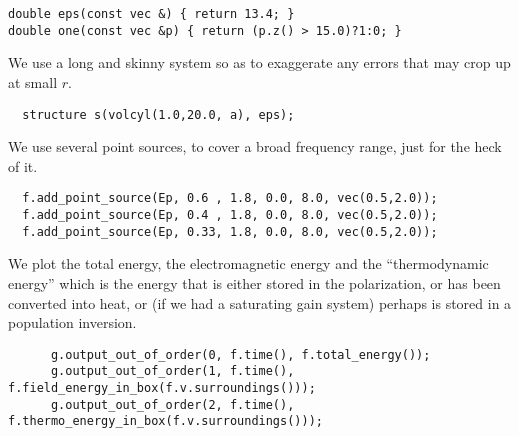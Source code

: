 \begin{verbatim}
double eps(const vec &) { return 13.4; }
double one(const vec &p) { return (p.z() > 15.0)?1:0; }
\end{verbatim}
\begin{comment}
int main(int argc, char **argv) {
  initialize mpi(argc, argv);
  deal_with_ctrl_c();
  const double ttot = 600.0;
\end{comment}
We use a long and skinny system so as to exaggerate any errors that may
crop up at small $r$.
\begin{verbatim}
  structure s(volcyl(1.0,20.0, a), eps);
\end{verbatim}
\begin{comment}
  const char *dirname = make_output_directory(__FILE__);
  s.set_output_directory(dirname);
  s.add_polarizability(one, 0.25, 0.1, 3.0);
  fields f(&s);
  grace g("energy", dirname);
\end{comment}
We use several point sources, to cover a broad frequency range, just for
the heck of it.
\begin{verbatim}
  f.add_point_source(Ep, 0.6 , 1.8, 0.0, 8.0, vec(0.5,2.0));
  f.add_point_source(Ep, 0.4 , 1.8, 0.0, 8.0, vec(0.5,2.0));
  f.add_point_source(Ep, 0.33, 1.8, 0.0, 8.0, vec(0.5,2.0));
\end{verbatim}
\begin{comment}
  double next_printtime = 50;
  while (f.time() < ttot && !interrupt) {
    if (f.time() >= next_printtime) {
      next_printtime += 50;
      master_printf("Working on time %
      master_printf("energy is %
\end{comment}
We plot the total energy, the electromagnetic energy and the
``thermodynamic energy'' which is the energy that is either stored in the
polarization, or has been converted into heat, or (if we had a saturating
gain system) perhaps is stored in a population inversion.
\begin{verbatim}
      g.output_out_of_order(0, f.time(), f.total_energy());
      g.output_out_of_order(1, f.time(), f.field_energy_in_box(f.v.surroundings()));
      g.output_out_of_order(2, f.time(), f.thermo_energy_in_box(f.v.surroundings()));
\end{verbatim}
\begin{comment}
    }
    f.step();
  }
}
\end{comment}
